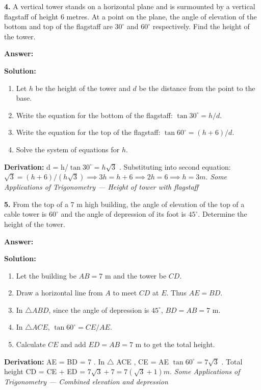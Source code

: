 \documentclass[12pt,a4paper]{exam}
\newcommand{\fitmath}[1]{%
  \sbox{\schmathbox}{$\displaystyle #1$}%
  \ifdim\wd\schmathbox>\linewidth
    \resizebox{\linewidth}{!}{\usebox{\schmathbox}}%
  \else
    \usebox{\schmathbox}%
  \fi}
\begin{document}
\begin{questions}
\question \textbf{4.} A vertical tower stands on a horizontal plane and is surmounted by a vertical flagstaff of height $6$ metres. At a point on the plane, the angle of elevation of the bottom and top of the flagstaff are $30^\circ$ and $60^\circ$ respectively. Find the height of the tower.

\textbf{Answer:}
\begin{center}
\fitmath{3 \text{metres}}
\end{center}

\textbf{Solution:}
\begin{enumerate}
  \item Let $h$ be the height of the tower and $d$ be the distance from the point to the base.
  \item Write the equation for the bottom of the flagstaff: $\tan 30^\circ = h/d$.
  \item Write the equation for the top of the flagstaff: $\tan 60^\circ = (h+6)/d$.
  \item Solve the system of equations for $h$.
\end{enumerate}
\textbf{Derivation:}
 d = h/$\tan 30^\circ = h\sqrt{3}$ . Substituting into second equation:  $\sqrt{3} = (h+6) / (h\sqrt{3}) \implies 3h = h+6 \implies 2h = 6 \implies h = 3  m.$
\hfill \textit{Some Applications of Trigonometry — Height of tower with flagstaff}
\vspace{0.3cm}

\question \textbf{5.} From the top of a $7$ m high building, the angle of elevation of the top of a cable tower is $60^\circ$ and the angle of depression of its foot is $45^\circ$. Determine the height of the tower.

\textbf{Answer:}
\begin{center}
\fitmath{7(1 + \sqrt{3}) \text{metres}}
\end{center}

\textbf{Solution:}
\begin{enumerate}
  \item Let the building be $AB = 7$ m and the tower be $CD$.
  \item Draw a horizontal line from $A$ to meet $CD$ at $E$. Thus $AE = BD$.
  \item In $\triangle ABD$, since the angle of depression is $45^\circ$, $BD = AB = 7$ m.
  \item In $\triangle ACE$, $\tan 60^\circ = CE / AE$.
  \item Calculate $CE$ and add $ED = AB = 7$ m to get the total height.
\end{enumerate}
\textbf{Derivation:}
 AE = BD = 7 . In  $\triangle$ ACE ,  CE = AE $\tan 60^\circ = 7\sqrt{3}$ . Total height  CD = CE + ED = 7$\sqrt{3} + 7 = 7(\sqrt{3} + 1)  m.$
\hfill \textit{Some Applications of Trigonometry — Combined elevation and depression}
\vspace{0.3cm}


\end{questions}
\end{document}
